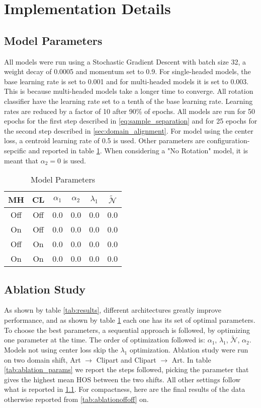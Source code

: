 \documentclass[10pt,twocolumn,letterpaper]{article}
\begin{document}
\section{Implementation Details}
\subsection{Model Parameters}
\label{sec:model_parameters}

All models were run using a Stochastic Gradient Descent with batch size 32, a weight decay of 0.0005 and momentum set to 0.9.
For single-headed models, the base learning rate is set to 0.001 and for multi-headed models it is set to 0.003.
This is because multi-headed models take a longer time to converge.
All rotation classifier have the learning rate set to a tenth of the base learning rate.
Learning rates are reduced by a factor of 10 after 90\% of epochs.
All models are run for 50 epochs for the first step described in \ref{eq:sample_separation} and for 25 epochs for the second step described in \ref{sec:domain_alignment}.
For model using the center loss, a centroid learning rate of 0.5 is used.
Other parameters are configuration-sepcific and reported in table \ref{tab:params}.
When considering a "No Rotation" model, it is meant that $\alpha_2 = 0$ is used.


\begin{table}
  \centering
  \begin{tabular}[b]{||c|c|c|c|c|c||}
    \hline
    MH & CL & $\alpha_1$ & $\alpha_2$ & $\lambda_1$ & $\mathcal{\tilde N}$ \\
    \hline
    Off & Off & 0.0 & 0.0 & 0.0 & 0.0 \\
    On & Off & 0.0 & 0.0 & 0.0 & 0.0 \\
    Off & On & 0.0 & 0.0 & 0.0 & 0.0 \\
    On & On & 0.0 & 0.0 & 0.0 & 0.0 \\
    \hline
  \end{tabular}
  \caption{\label{tab:params}Model Parameters}
\end{table}

\subsection{Ablation Study}
\label{sec:ablation_study}
As shown by table \ref{tab:results}, different architectures greatly improve performance, and as shown by table \ref{tab:params} each one has its set of optimal parameters.
To choose the best parameters, a sequential approach is followed, by optimizing one parameter at the time.
The order of optimization followed is: $\alpha_1$, $\lambda_1$, $\mathcal{\tilde N}$, $\alpha_2$.
Models not using center loss skip the $\lambda_1$ optimization.
Ablation study were run on two domain shift, Art $\to$ Clipart and Clipart $\to$ Art.
In table \ref{tab:ablation_params} we report the steps followed, picking the parameter that gives the highest mean HOS between the two shifts.
All other settings follow what is reported in \ref{sec:model_parameters}.
For compactness, here are the final results of the data otherwise reported from \ref{tab:ablationoffoff} on.
\end{document}
